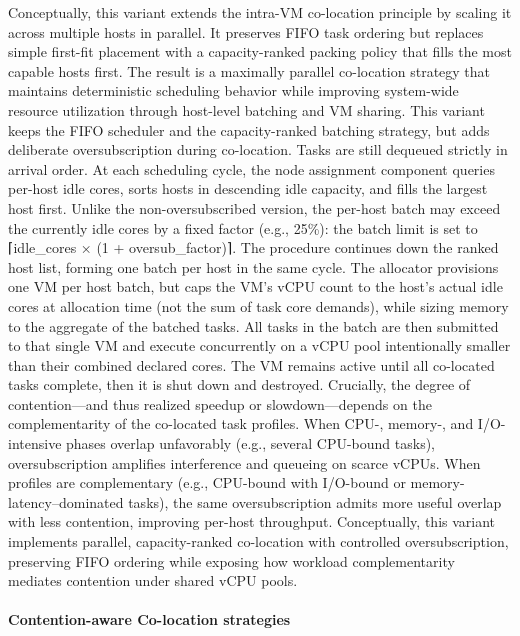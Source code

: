 Conceptually, this variant extends the intra-VM co-location principle by scaling it across multiple hosts in parallel. It preserves FIFO task ordering but replaces simple first-fit placement with a capacity-ranked packing policy that fills the most capable hosts first. The result is a maximally parallel co-location strategy that maintains deterministic scheduling behavior while improving system-wide resource utilization through host-level batching and VM sharing.
This variant keeps the FIFO scheduler and the capacity-ranked batching strategy, but adds deliberate oversubscription during co-location. Tasks are still dequeued strictly in arrival order. At each scheduling cycle, the node assignment component queries per-host idle cores, sorts hosts in descending idle capacity, and fills the largest host first. Unlike the non-oversubscribed version, the per-host batch may exceed the currently idle cores by a fixed factor (e.g., 25\%): the batch limit is set to ⌈idle_cores × (1 + oversub_factor)⌉. The procedure continues down the ranked host list, forming one batch per host in the same cycle.
The allocator provisions one VM per host batch, but caps the VM’s vCPU count to the host’s actual idle cores at allocation time (not the sum of task core demands), while sizing memory to the aggregate of the batched tasks. All tasks in the batch are then submitted to that single VM and execute concurrently on a vCPU pool intentionally smaller than their combined declared cores. The VM remains active until all co-located tasks complete, then it is shut down and destroyed.
Crucially, the degree of contention—and thus realized speedup or slowdown—depends on the complementarity of the co-located task profiles. When CPU-, memory-, and I/O-intensive phases overlap unfavorably (e.g., several CPU-bound tasks), oversubscription amplifies interference and queueing on scarce vCPUs. When profiles are complementary (e.g., CPU-bound with I/O-bound or memory-latency–dominated tasks), the same oversubscription admits more useful overlap with less contention, improving per-host throughput. Conceptually, this variant implements parallel, capacity-ranked co-location with controlled oversubscription, preserving FIFO ordering while exposing how workload complementarity mediates contention under shared vCPU pools.

\paragraph{Contention-aware Co-location strategies}
\label{sec:co-location_strategies}


